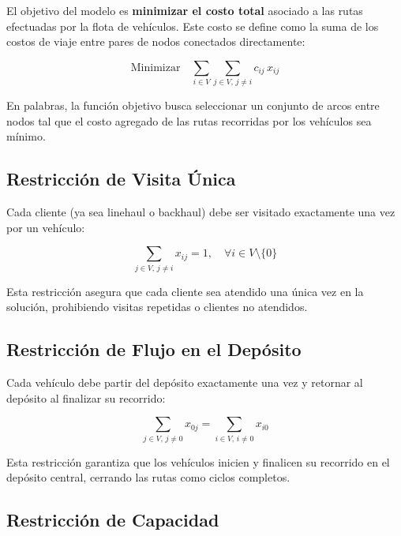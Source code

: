 \documentclass[letter, 10pt]{article}
\begin{document}
El objetivo del modelo es \textbf{minimizar el costo total} asociado a las rutas efectuadas por la flota de veh\'iculos. Este costo se define como la suma de los costos de viaje entre pares de nodos conectados directamente:

\begin{equation}
\text{Minimizar} \quad \sum_{i \in V} \sum_{j \in V, \, j \neq i} c_{ij} \, x_{ij}
\label{eq:objetivo}
\end{equation}

En palabras, la funci\'on objetivo busca seleccionar un conjunto de arcos entre nodos tal que el costo agregado de las rutas recorridas por los veh\'iculos sea m\'inimo.

\subsection*{Restricci\'on de Visita \'Unica}

Cada cliente (ya sea linehaul o backhaul) debe ser visitado exactamente una vez por un veh\'iculo:

\begin{equation}
\sum_{j \in V, \, j \neq i} x_{ij} = 1, \quad \forall i \in V \setminus \{0\}
\label{eq:visita}
\end{equation}

Esta restricci\'on asegura que cada cliente sea atendido una \'unica vez en la soluci\'on, prohibiendo visitas repetidas o clientes no atendidos.

\subsection*{Restricci\'on de Flujo en el Dep\'osito}

Cada veh\'iculo debe partir del dep\'osito exactamente una vez y retornar al dep\'osito al finalizar su recorrido:

\begin{equation}
\sum_{j \in V, \, j \neq 0} x_{0j} = \sum_{i \in V, \, i \neq 0} x_{i0}
\label{eq:flujoDeposito}
\end{equation}

Esta restricci\'on garantiza que los veh\'iculos inicien y finalicen su recorrido en el dep\'osito central, cerrando las rutas como ciclos completos.

\subsection*{Restricci\'on de Capacidad}
\end{document}
